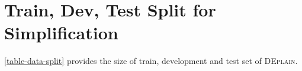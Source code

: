 \documentclass[11pt]{article}
\begin{document}
\begin{comment}
\paragraph{Personal and Sensitive Information}
No sensitive data.

\subsubsection{Considerations for Using the Data}
\paragraph{Social Impact of Dataset}
Many people do not understand texts due to their complexity. With automatic text simplification methods, the texts can be simplified for them. Our new training data can benefit in training a TS model.
\paragraph{Discussion of Biases}
no bias is known.
\paragraph{Other Known Limitations}
See the limitation section. 
\subsubsection{Additional Information}
\paragraph{Dataset Curators}
Regina Stodden contact via \texttt{regina.stodden@hhu.de}
\paragraph{Licensing Information}
The corpus includes the following licenses: restricted (can be shared upon request), CC-BY-SA-3, CC-BY-4, CC-BY-NC-ND-4, MIT.


    
\end{comment}


\section{Train, Dev, Test Split for Simplification}
\label{appendix-train-dev-test}
\autoref{table-data-split} provides the size of train, development and test set of \textsc{DEplain}.
\end{document}
